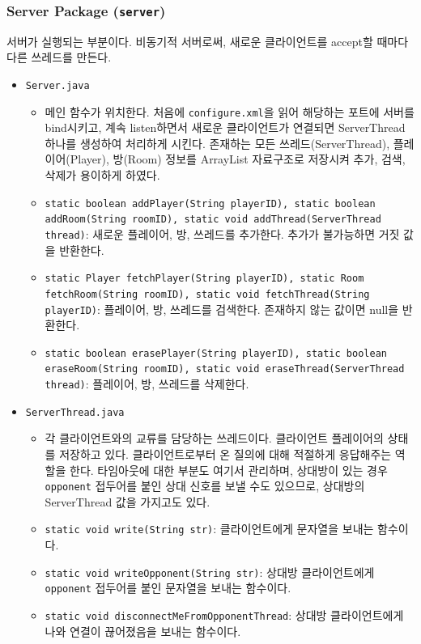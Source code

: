 \documentclass[a4paper, 10pt]{article}
\begin{document}
\subsubsection{Server Package (\texttt{server})}
서버가 실행되는 부분이다. 비동기적 서버로써, 새로운 클라이언트를 accept할 때마다
다른 쓰레드를 만든다.
\begin{itemize}
  \item \texttt{Server.java}
  \begin{itemize}
    \item[] 메인 함수가 위치한다. 처음에 \texttt{configure.xml}을 읽어 해당하는 포트에
    서버를 bind시키고, 계속 listen하면서 새로운 클라이언트가 연결되면 ServerThread 하나를
    생성하여 처리하게 시킨다. 존재하는 모든 쓰레드(ServerThread), 플레이어(Player), 방(Room)
    정보를 ArrayList 자료구조로 저장시켜 추가, 검색, 삭제가 용이하게 하였다.
    \item \texttt{static boolean addPlayer(String playerID), {static boolean addRoom(String roomID)}, static void addThread(ServerThread thread)}:
    새로운 플레이어, 방, 쓰레드를 추가한다. 추가가 불가능하면 거짓 값을 반환한다.
    \item \texttt{static Player fetchPlayer(String playerID), static Room fetchRoom(String roomID), static void fetchThread(String playerID)}:
    플레이어, 방, 쓰레드를 검색한다. 존재하지 않는 값이면 null을 반환한다.
    \item \texttt{static boolean erasePlayer(String playerID), static boolean eraseRoom(String roomID), static void eraseThread(ServerThread thread)}:
    플레이어, 방, 쓰레드를 삭제한다.
  \end{itemize}
  \item \texttt{ServerThread.java}
  \begin{itemize}
    \item[] 각 클라이언트와의 교류를 담당하는 쓰레드이다. 클라이언트 플레이어의 상태를 저장하고 있다.
    클라이언트로부터 온 질의에 대해 적절하게 응답해주는 역할을 한다. 타임아웃에 대한 부분도 여기서 관리하며,
    상대방이 있는 경우 \texttt{opponent} 접두어를 붙인 상대 신호를 보낼 수도 있으므로, 상대방의 ServerThread 값을 가지고도 있다.
    \item \texttt{static void write(String str)}: 클라이언트에게 문자열을 보내는 함수이다.
    \item \texttt{static void writeOpponent(String str)}: 상대방 클라이언트에게 \texttt{opponent} 접두어를 붙인 문자열을 보내는 함수이다.
    \item \texttt{static void disconnectMeFromOpponentThread}: 상대방 클라이언트에게 나와 연결이 끊어졌음을 보내는 함수이다.

\end{itemize}
\end{itemize}
\end{document}
